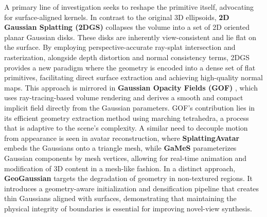 \documentclass[11pt,a4paper]{article}
\begin{document}
A primary line of investigation seeks to reshape the primitive itself, advocating for surface-aligned kernels. In contrast to the original 3D ellipsoids, \textbf{2D Gaussian Splatting (2DGS)} \cite{arxiv:2403.17888v1} collapses the volume into a set of 2D oriented planar Gaussian disks. These disks are inherently view-consistent and lie flat on the surface. By employing perspective-accurate ray-splat intersection and rasterization, alongside depth distortion and normal consistency terms, 2DGS provides a new paradigm where the geometry is encoded into a dense set of flat primitives, facilitating direct surface extraction and achieving high-quality normal maps. This approach is mirrored in \textbf{Gaussian Opacity Fields (GOF)} \cite{arxiv:2404.10772v1}, which uses ray-tracing-based volume rendering and derives a smooth and compact implicit field directly from the Gaussian parameters. GOF's contribution lies in its efficient geometry extraction method using marching tetrahedra, a process that is adaptive to the scene's complexity. A similar need to decouple motion from appearance is seen in avatar reconstruction, where \textbf{SplattingAvatar} \cite{arxiv:2403.05087v1} embeds the Gaussians onto a triangle mesh, while \textbf{GaMeS} \cite{arxiv:2402.01459v3} parameterizes Gaussian components by mesh vertices, allowing for real-time animation and modification of 3D content in a mesh-like fashion. In a distinct approach, \textbf{GeoGaussian} \cite{arxiv:2403.11324v1} targets the degradation of geometry in non-textured regions. It introduces a geometry-aware initialization and densification pipeline that creates thin Gaussians aligned with surfaces, demonstrating that maintaining the physical integrity of boundaries is essential for improving novel-view synthesis.
\end{document}
